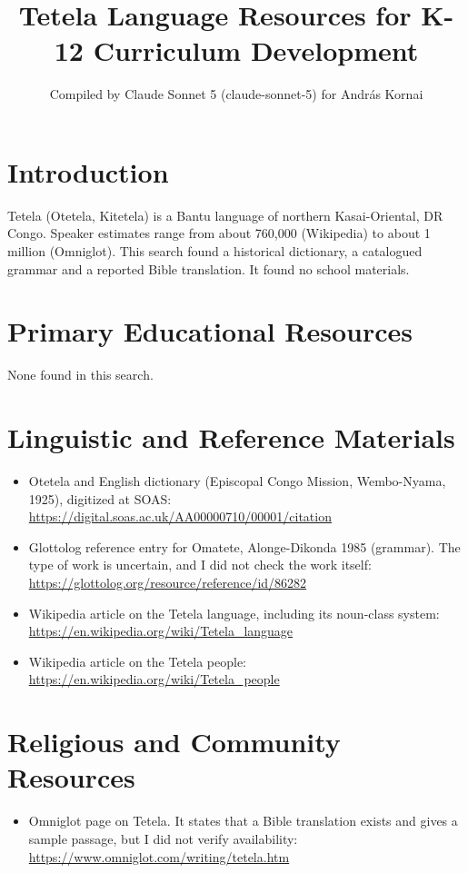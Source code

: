 \documentclass[12pt]{article}
\title{Tetela Language Resources for K-12 Curriculum Development}
\author{Compiled by Claude Sonnet 5 (claude-sonnet-5) for Andr\'as Kornai}
\date{}
\begin{document}
\maketitle

\section{Introduction}
Tetela (Otetela, Kitetela) is a Bantu language of northern Kasai-Oriental, DR Congo. Speaker estimates range from about 760,000 (Wikipedia) to about 1 million (Omniglot). This search found a historical dictionary, a catalogued grammar and a reported Bible translation. It found no school materials.

\section{Primary Educational Resources}
None found in this search.

\section{Linguistic and Reference Materials}
\begin{itemize}
\item Otetela and English dictionary (Episcopal Congo Mission, Wembo-Nyama, 1925), digitized at SOAS: \url{https://digital.soas.ac.uk/AA00000710/00001/citation}
\item Glottolog reference entry for Omatete, Alonge-Dikonda 1985 (grammar). The type of work is uncertain, and I did not check the work itself: \url{https://glottolog.org/resource/reference/id/86282}
\item Wikipedia article on the Tetela language, including its noun-class system: \url{https://en.wikipedia.org/wiki/Tetela_language}
\item Wikipedia article on the Tetela people: \url{https://en.wikipedia.org/wiki/Tetela_people}
\end{itemize}

\section{Religious and Community Resources}
\begin{itemize}
\item Omniglot page on Tetela. It states that a Bible translation exists and gives a sample passage, but I did not verify availability: \url{https://www.omniglot.com/writing/tetela.htm}
\end{itemize}
\end{document}
